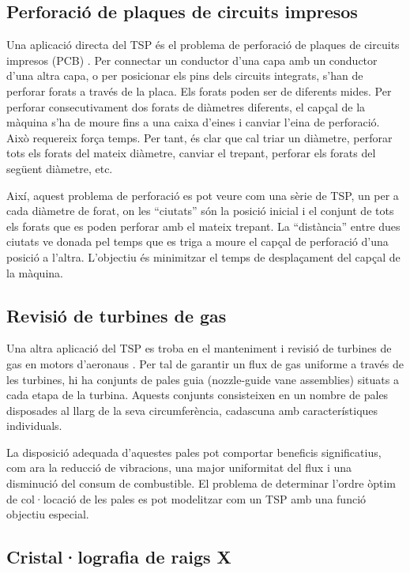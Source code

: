 \documentclass[a4paper,12pt,twoside]{ThesisStyle}
\begin{document}
\subsection{Perforació de plaques de circuits impresos}

Una aplicació directa del TSP és el problema de perforació de plaques de circuits impresos (PCB) \cite{grotschel1991drilling}. Per connectar un conductor d'una capa amb un conductor d'una altra capa, o per posicionar els pins dels circuits integrats, s'han de perforar forats a través de la placa. Els forats poden ser de diferents mides. Per perforar consecutivament dos forats de diàmetres diferents, el capçal de la màquina s'ha de moure fins a una caixa d'eines i canviar l'eina de perforació. Això requereix força temps. Per tant, és clar que cal triar un diàmetre, perforar tots els forats del mateix diàmetre, canviar el trepant, perforar els forats del següent diàmetre, etc.

Així, aquest problema de perforació es pot veure com una sèrie de TSP, un per a cada diàmetre de forat, on les ``ciutats'' són la posició inicial i el conjunt de tots els forats que es poden perforar amb el mateix trepant. La ``distància'' entre dues ciutats ve donada pel temps que es triga a moure el capçal de perforació d'una posició a l'altra. L'objectiu és minimitzar el temps de desplaçament del capçal de la màquina.

\subsection{Revisió de turbines de gas}

Una altra aplicació del TSP es troba en el manteniment i revisió de turbines de gas en motors d'aeronaus \cite{plante1987product}. Per tal de garantir un flux de gas uniforme a través de les turbines, hi ha conjunts de pales guia (nozzle-guide vane assemblies) situats a cada etapa de la turbina. Aquests conjunts consisteixen en un nombre de pales disposades al llarg de la seva circumferència, cadascuna amb característiques individuals.

La disposició adequada d'aquestes pales pot comportar beneficis significatius, com ara la reducció de vibracions, una major uniformitat del flux i una disminució del consum de combustible. El problema de determinar l'ordre òptim de col·locació de les pales es pot modelitzar com un TSP amb una funció objectiu especial.

\subsection{Cristal·lografia de raigs X}
\end{document}

